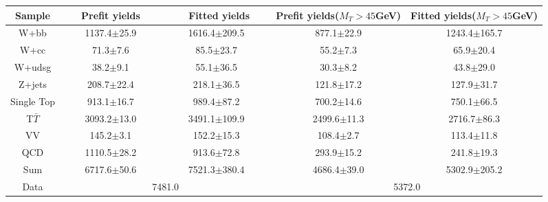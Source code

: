  \begin{adjustbox}{width=\textwidth,center=\textwidth}
   \begin{tabular} {c|cc|cc} \hline\hline
			 Sample & ~~~Prefit yields~~~ & ~~~~Fitted yields~~~ & Prefit yields($M_T>45$GeV) & Fitted yields($M_T>45$GeV) \\ 
 \hline
W+bb&1137.4$\pm$25.9&1616.4$\pm$209.5&877.1$\pm$22.9&1243.4$\pm$165.7\\
W+cc&71.3$\pm$7.6&85.5$\pm$23.7&55.2$\pm$7.3&65.9$\pm$20.4\\
W+udsg&38.2$\pm$9.1&55.1$\pm$36.5&30.3$\pm$8.2&43.8$\pm$29.0\\
Z+jets&208.7$\pm$22.4&218.1$\pm$36.5&121.8$\pm$17.2&127.9$\pm$31.7\\
Single Top&913.1$\pm$16.7&989.4$\pm$87.2&700.2$\pm$14.6&750.1$\pm$66.5\\
T$\bar{T}$&3093.2$\pm$13.0&3491.1$\pm$109.9&2499.6$\pm$11.3&2716.7$\pm$86.3\\
VV&145.2$\pm$3.1&152.2$\pm$15.3&108.4$\pm$2.7&113.4$\pm$11.8\\
QCD&1110.5$\pm$28.2&913.6$\pm$72.8&293.9$\pm$15.2&241.8$\pm$19.3\\
\hline
Sum &6717.6$\pm$50.6&7521.3$\pm$380.4&4686.4$\pm$39.0&5302.9$\pm$205.2\\
\hline
Data&\multicolumn{2}{c}{7481.0}&\multicolumn{2}{c}{5372.0}\\
   \hline\hline
   \end{tabular}
 \end{adjustbox}
